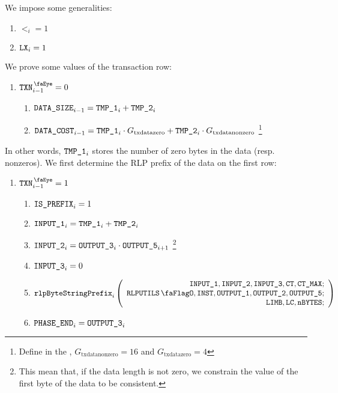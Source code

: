 \begin{center}
\end{center}
We impose some generalities:
\begin{enumerate}
	\item $\lt_{i}=1$
	\item $\texttt{LX}_{i}=1$
\end{enumerate}
We prove some values of the transaction row:
\begin{enumerate}[resume]
	\item \If $\isTxn_{i-1}=0$ \Then
		\begin{enumerate}
			\item $\texttt{DATA\_SIZE}_{i-1} = \texttt{TMP\_1}_{i} + \texttt{TMP\_2}_{i}$
			\item $\texttt{DATA\_COST}_{i-1} = \texttt{TMP\_1}_{i} \cdot G_{\mathrm{txdatazero}} + \texttt{TMP\_2}_{i} \cdot G_{\mathrm{txdatanonzero}}$ 
				\footnote{Define in the \cite{EYP-London}, $G_{\mathrm{txdatanonzero}}=16$ and $G_{\mathrm{txdatazero}}=4$}
		\end{enumerate}
\end{enumerate}
In other words, $\texttt{TMP\_1}_{i}$ stores the number of zero bytes in the data (resp. nonzeros). 
\newline
We first determine the RLP prefix of the data on the first row:
\begin{enumerate}[resume]
	\item \If $\isTxn_{i-1}=1$ \Then
		\begin{enumerate}
			\item $\texttt{IS\_PREFIX}_{i} = 1$
			\item $\texttt{INPUT\_1}_{i} = \texttt{TMP\_1}_{i} + \texttt{TMP\_2}_{i}$
			\item $\texttt{INPUT\_2}_{i} = \texttt{OUTPUT\_3}_{i} \cdot \texttt{OUTPUT\_5}_{i+1}$
				\footnote{This mean that, if the data length is not zero, we constrain the value of the first byte of the data to be consistent.}
			\item $\texttt{INPUT\_3}_{i} = 0$ 
			\item 
				\[
					\rlpBytestringPrefix_{i}
					\left(
					\begin{array}{r}
						\inputColumn{1},
						\inputColumn{2},
						\inputColumn{3},
						\ct,
						\maxCt; \\
						\rlpUtilsFlag,
						\INST,
						\resultColumn{1},
						\resultColumn{2},
						\resultColumn{5}; \\
						\limb,
						\lc,
						\limbsize; \\
					\end{array}
					\right)
				\]
			\item $\texttt{PHASE\_END}_{i} = \texttt{OUTPUT\_3}_{i}$
		\end{enumerate}
\end{enumerate}

